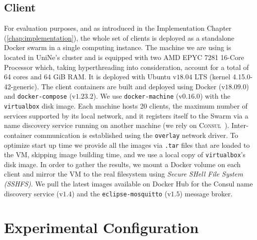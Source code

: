 \subsection{Client} \label{sec:evaluation:hardware:client}
For evaluation purposes, and as introduced in the Implementation Chapter (\ref{chap:implementation}), the whole set of clients is deployed as a standalone Docker swarm in a single computing instance. 
The machine we are using is located in UniNe's cluster and is equipped with two AMD EPYC 7281 16-Core Processor which, taking hyperthreading into consideration, account for a total of 64 cores and 64 GiB RAM. 
It is deployed with Ubuntu v$18.04$ LTS (kernel 4.15.0-42-generic). 
The client containers are built and deployed using Docker (v$18.09.0$) and \texttt{docker-compose} (v$1.23.2$). 
We use \texttt{docker-machine} (v$0.16.0$) with the \texttt{virtualbox} disk image. 
Each machine hosts 20 clients, the maximum number of services supported by its local network, and it registers itself to the Swarm via a name discovery service running on another machine (we rely on \textsc{Consul}~\cite{consul-image}).
Inter-container communication is established using the \texttt{overlay} network driver.
To optimize start up time we provide all the images via \texttt{.tar} files that are loaded to the VM, skipping image building time, and we use a local copy of \texttt{virtualbox}'s disk image.
In order to gather the results, we mount a Docker volume on each client and mirror the VM to the real filesystem using \textit{Secure SHell File System (SSHFS)}. 
We pull the latest images available on Docker Hub for the Consul name discovery service (v$1.4$) and the \texttt{eclipse-mosquitto} (v$1.5$) message broker.

\section{Experimental Configuration} \label{sec:evaluation:experiments}


